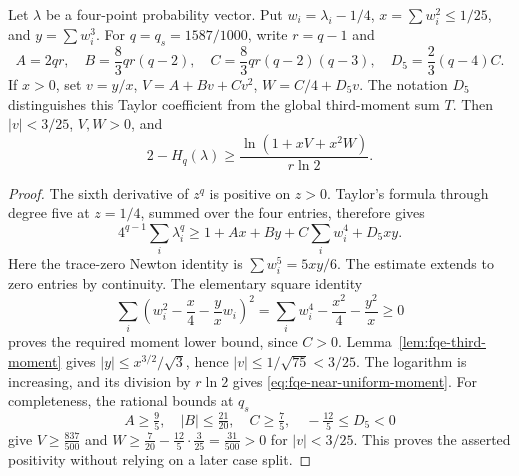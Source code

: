 \begin{lemma}
\label{lem:fqe-near-uniform-moment}
Let $\lambda$ be a four-point probability vector. Put
$w_i=\lambda_i-1/4$, $x=\sum w_i^2\le1/25$, and $y=\sum w_i^3$.
For $q=q_s=1587/1000$, write $r=q-1$ and
\[
A=2qr,\quad B=\frac83qr(q-2),\quad
C=\frac83qr(q-2)(q-3),\quad D_5=\frac23(q-4)C.
\]
If $x>0$, set $v=y/x$, $V=A+Bv+Cv^2$, $W=C/4+D_5v$.
The notation $D_5$ distinguishes this Taylor coefficient from the
global third-moment sum $T$.
Then $|v|<3/25$, $V,W>0$, and
\[
2-H_q(\lambda)\ge
\frac{\ln(1+xV+x^2W)}{r\ln2}.
\tag{NU}\label{eq:fqe-near-uniform-moment}
\]
\end{lemma}
\begin{proof}
The sixth derivative of $z^q$ is positive on $z>0$. Taylor's formula
through degree five at $z=1/4$, summed over the four entries, therefore gives
\[
4^{q-1}\sum_i\lambda_i^q
\ge1+Ax+By+C\sum_iw_i^4+D_5xy.
\]
Here the trace-zero Newton identity is
$\sum w_i^5=5xy/6$. The estimate extends to zero entries by continuity.
The elementary square identity
\[
\sum_i\left(w_i^2-\frac x4-\frac yx w_i\right)^2
=\sum_iw_i^4-\frac{x^2}4-\frac{y^2}x\ge0
\]
proves the required moment lower bound, since $C>0$.
Lemma~\ref{lem:fqe-third-moment} gives $|y|\le x^{3/2}/\sqrt3$,
hence $|v|\le1/\sqrt{75}<3/25$. The logarithm is increasing,
and its division by $r\ln2$ gives \eqref{eq:fqe-near-uniform-moment}.
For completeness, the rational bounds at $q_s$
\[
 A\ge\tfrac95,\quad |B|\le\tfrac{21}{20},\quad
 C\ge\tfrac75,\quad -\tfrac{12}5\le D_5<0
\]
give $V\ge\tfrac{837}{500}$ and
$W\ge\tfrac7{20}-\tfrac{12}5\cdot\tfrac3{25}
=\tfrac{31}{500}>0$ for $|v|<3/25$.
This proves the asserted positivity without relying on a later case split.
\end{proof}

